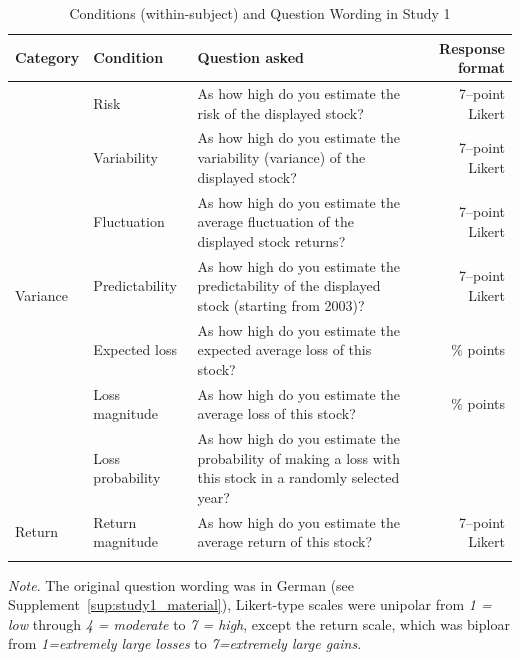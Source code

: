 \documentclass[a4paper,man, natbib,floatsintext]{apa6} %
\begin{document}

\begin{table}[hb!]
\centering
\onehalfspacing
\begin{threeparttable}
\caption{Conditions (within-subject) and Question Wording in Study 1}
\small
\label{table:Questions}
\begin{tabularx}{\columnwidth}{p{1.7cm}p{2.9cm}p{7cm}r{0.5cm}}
Category & Condition & Question asked & Response format \\
\toprule
\multirow{7}{*}{Variance} & Risk & As how high do you estimate the risk of the displayed stock? & 7--point Likert \\
& Variability & As how high do you estimate the variability (variance) of the displayed stock? & 7--point Likert \\
&  Fluctuation & As how high do you estimate the average fluctuation of the displayed stock returns? & 7--point Likert \\ 
 & Predictability & As how high do you estimate the predictability of the displayed stock (starting from 2003)? & 7--point Likert \\
 \cmidrule{2-4}
\multirow{7}{*}{Loss} & Expected loss & As how high do you estimate the expected average loss of this stock? &  $\%$ points \\
     & Loss magnitude & As how high do you estimate the average loss of this stock? & $\%$ points\\
     & Loss probability & As how high do you estimate the probability of making a loss with this stock in a randomly selected year?\\
 \cmidrule{2-4}
\multirow{1}{*}{Return} & Return magnitude & As how high do you estimate the average return of this stock? & 7--point Likert \\
\bottomrule
\\
\end{tabularx}
\begin{tablenotes}
\small
\item
 \textit{Note}. The original question wording was in German (see Supplement~\ref{sup:study1_material}), Likert-type scales were unipolar from \textit{1 = low} through \textit{4 = moderate} to \textit{7 = high}, except the return scale, which was biploar from \textit{1=extremely large losses} to \textit{7=extremely large gains}.

\end{tablenotes}
\end{threeparttable}
\end{table}
\end{document}
